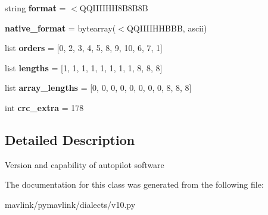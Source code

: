 \begin{DoxyCompactItemize}
\item 
\mbox{\label{classpymavlink_1_1dialects_1_1v10_1_1MAVLink__autopilot__version__message_af68bc764bb18115455792cac8bc687f2}} 
string {\bfseries format} = \textquotesingle{}$<$Q\+Q\+I\+I\+I\+I\+H\+H8\+B8\+B8B\textquotesingle{}
\item 
\mbox{\label{classpymavlink_1_1dialects_1_1v10_1_1MAVLink__autopilot__version__message_a47c395435e3743be8f416abe0bfb0306}} 
{\bfseries native\+\_\+format} = bytearray(\textquotesingle{}$<$Q\+Q\+I\+I\+I\+I\+H\+H\+B\+BB\textquotesingle{}, \textquotesingle{}ascii\textquotesingle{})
\item 
\mbox{\label{classpymavlink_1_1dialects_1_1v10_1_1MAVLink__autopilot__version__message_aad44164d063b6d9c07d7b6902c9ae7e3}} 
list {\bfseries orders} = \mbox{[}0, 2, 3, 4, 5, 8, 9, 10, 6, 7, 1\mbox{]}
\item 
\mbox{\label{classpymavlink_1_1dialects_1_1v10_1_1MAVLink__autopilot__version__message_a4092c7c4db8991365522c0eb99ae8272}} 
list {\bfseries lengths} = \mbox{[}1, 1, 1, 1, 1, 1, 1, 1, 8, 8, 8\mbox{]}
\item 
\mbox{\label{classpymavlink_1_1dialects_1_1v10_1_1MAVLink__autopilot__version__message_a8b66b1c93388519e32757ce5abcbdf3b}} 
list {\bfseries array\+\_\+lengths} = \mbox{[}0, 0, 0, 0, 0, 0, 0, 0, 8, 8, 8\mbox{]}
\item 
\mbox{\label{classpymavlink_1_1dialects_1_1v10_1_1MAVLink__autopilot__version__message_aff50602bd2ad0871a974f5f356ed5c7b}} 
int {\bfseries crc\+\_\+extra} = 178
\end{DoxyCompactItemize}


\subsection{Detailed Description}
\begin{DoxyVerb}Version and capability of autopilot software
\end{DoxyVerb}
 

The documentation for this class was generated from the following file\+:\begin{DoxyCompactItemize}
\item 
mavlink/pymavlink/dialects/v10.\+py\end{DoxyCompactItemize}

